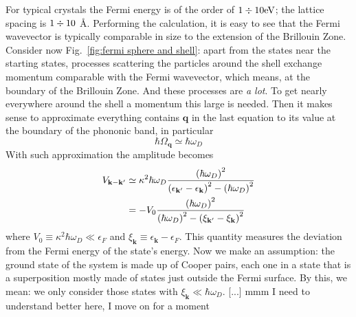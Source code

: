 For typical crystals the Fermi energy is of the order of $1 \divisionsymbol 10 \mathrm{eV}$; the lattice spacing is $1 \divisionsymbol 10$ \r{A}. Performing the calculation, it is easy to see that the Fermi wavevector is typically comparable in size to the extension of the Brillouin Zone. Consider now Fig.~\ref{fig:fermi sphere and shell}: apart from the states near the starting states, processes scattering the particles around the shell exchange momentum comparable with the Fermi wavevector, which means, at the boundary of the Brillouin Zone. And these processes are \textit{a lot}. To get nearly everywhere around the shell a momentum this large is needed. Then it makes sense to approximate everything contains $\mathbf{q}$ in the last equation to its value at the boundary of the phononic band, in particular
\[
	\hbar\Omega_\mathbf{q} \simeq \hbar\omega_D
\]
With such approximation the amplitude becomes
\[
\begin{aligned}
	V_{\mathbf{k}-\mathbf{k}'} &\simeq \kappa^2 \hbar\omega_D \frac{
		\left({\hbar\omega_D}\right)^2
	}{
		\left({\epsilon_{\mathbf{k}'} - \epsilon_\mathbf{k}}\right)^2 - \left({\hbar\omega_D}\right)^2
	} \\
	&= - V_0 \frac{
		\left({\hbar\omega_D}\right)^2
	}{
		\left({\hbar\omega_D}\right)^2 - \left({\xi_{\mathbf{k}'} - \xi_\mathbf{k}}\right)^2
	}
\end{aligned}
\]
where $V_0 \equiv \kappa^2 \hbar\omega_D \ll \epsilon_F$ and $\xi_\mathbf{k} \equiv \epsilon_\mathbf{k} - \epsilon_F$. This quantity measures the deviation from the Fermi energy of the state's energy. Now we make an assumption: the ground state of the system is made up of Cooper pairs, each one in a state that is a superposition mostly made of states just outside the Fermi surface. By this, we mean: we only consider those states with $\xi_\mathbf{k} \ll \hbar\omega_D$. [...] {\color{red}mmm I need to understand better here, I move on for a moment}

